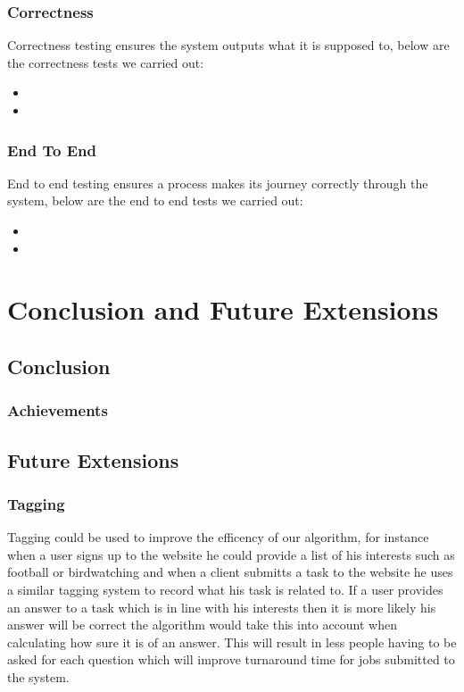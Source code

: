\documentclass[11pt]{article}
\begin{document}
\subsubsection{Correctness}
Correctness testing ensures the system outputs what it is supposed to, below are the correctness tests we carried out:
\begin{itemize}
\item
\item
\end{itemize}
\subsubsection{End To End}
End to end testing ensures a process makes its journey correctly through the system, below are the end to end tests we carried out:
\begin{itemize}
\item
\item
\end{itemize}


\section{Conclusion and Future Extensions}

\subsection{Conclusion}
\subsubsection{Achievements}
\subsection{Future Extensions}

\subsubsection{Tagging}
Tagging could be used to improve the efficency of our algorithm, for instance when a user signs up to the website he could provide a list of his
interests such as football or birdwatching and when a client submitts a task to the website he uses a similar tagging system to record what his
task is related to. If a user provides an answer to a task which is in line with his interests then it is more likely his answer will be correct
the algorithm would take this into account when calculating how sure it is of an answer. This will result in less people having to be asked 
for each question which will improve turnaround time for jobs submitted to the system. 
\end{document}
